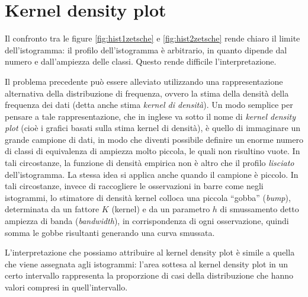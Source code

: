 \documentclass[
  11pt,
  italian,
  a4paper,
  extrafontsizes,onecolumn,openright
  ]{memoir}
\theoremstyle{definition}
\theoremstyle{definition}
\theoremstyle{definition}
\theoremstyle{definition}
\theoremstyle{remark}
\begin{document}
\hypertarget{kernel-density-plot}{%
\section{Kernel density plot}\label{kernel-density-plot}}

Il confronto tra le figure \ref{fig:hist1zetsche} e \ref{fig:hist2zetsche} rende chiaro il limite dell'istogramma: il profilo dell'istogramma è arbitrario, in quanto dipende dal numero e dall'ampiezza delle classi. Questo rende difficile l'interpretazione.

Il problema precedente può essere alleviato utilizzando una
rappresentazione alternativa della distribuzione di frequenza, ovvero la
stima della densità della frequenza dei dati (detta anche stima \emph{kernel
di densità}). Un modo semplice per pensare a tale rappresentazione, che
in inglese va sotto il nome di \emph{kernel density plot} (cioè i grafici basati sulla stima kernel di densità), è quello di immaginare un grande campione di dati, in modo che diventi possibile definire un enorme numero di classi di equivalenza di ampiezza molto piccola, le quali non risultino vuote. In tali circostanze, la funzione di densità empirica non è altro che il profilo \emph{lisciato} dell'istogramma. La stessa idea si applica anche quando il campione è piccolo. In tali circostanze, invece di raccogliere le osservazioni in barre come negli istogrammi, lo stimatore di densità kernel colloca una piccola ``gobba'' (\emph{bump}), determinata da un fattore \(K\) (kernel) e da un parametro \(h\) di smussamento detto ampiezza di banda (\emph{bandwidth}), in corrispondenza di ogni osservazione, quindi somma le gobbe risultanti generando una curva smussata.

L'interpretazione che possiamo attribuire al kernel density plot è simile a quella che viene assegnata agli istogrammi: l'area sottesa al kernel density plot in un certo intervallo rappresenta la proporzione di casi della distribuzione che hanno valori compresi in quell'intervallo.
\end{document}
